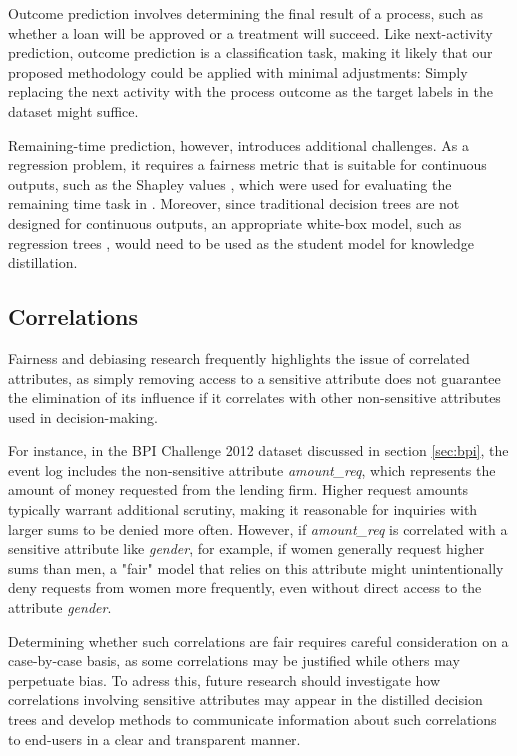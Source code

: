 Outcome prediction involves determining the final result of a process,
such as whether a loan will be approved or a treatment will succeed.
Like next-activity prediction, outcome prediction is a classification task,
making it likely that our proposed methodology could be applied with minimal adjustments:
Simply replacing the next activity with the process outcome as the target labels in the dataset might suffice.

Remaining-time prediction, however, introduces additional challenges.
As a regression problem, it requires a fairness metric that is suitable for continuous outputs,
such as the Shapley values \cite{shapley}, which were used for evaluating the remaining time task in \cite{fairness_adversarial}. 
Moreover, since traditional decision trees are not designed for continuous outputs,
an appropriate white-box model, such as regression trees \cite{trees},
would need to be used as the student model for knowledge distillation.

\subsection{Correlations}
Fairness and debiasing research frequently highlights the issue of correlated attributes,
as simply removing access to a sensitive attribute does not guarantee the elimination of its influence
if it correlates with other non-sensitive attributes used in decision-making.

For instance, in the BPI Challenge 2012 dataset discussed in section \ref{sec:bpi},
the event log includes the non-sensitive attribute \textit{amount\_req},
which represents the amount of money requested from the lending firm.
Higher request amounts typically warrant additional scrutiny,
making it reasonable for inquiries with larger sums to be denied more often. 
However, if \textit{amount\_req} is correlated with a sensitive attribute like \textit{gender},
for example, if women generally request higher sums than men,
a "fair" model that relies on this attribute might unintentionally deny requests from women more frequently,
even without direct access to the attribute \textit{gender}.

Determining whether such correlations are fair requires careful consideration on a case-by-case basis,
as some correlations may be justified while others may perpetuate bias.
To adress this, future research should investigate how correlations involving sensitive attributes may
appear in the distilled decision trees and develop methods to communicate information about such correlations
to end-users in a clear and transparent manner.

